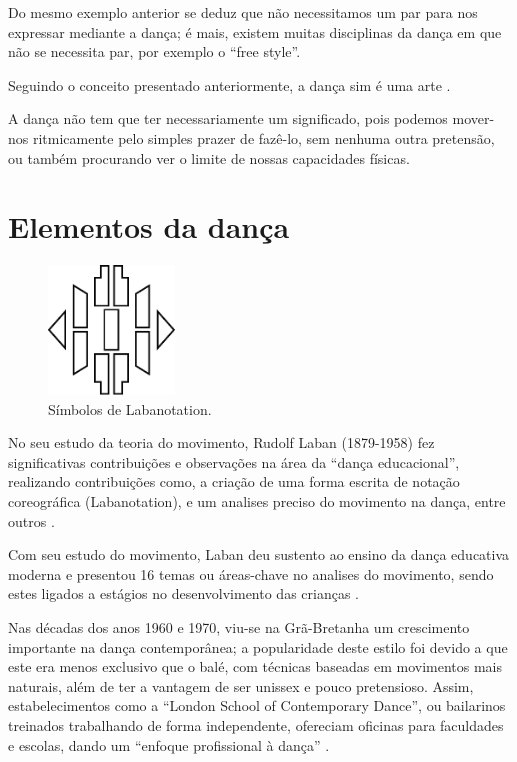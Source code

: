 Do mesmo exemplo anterior se deduz que não necessitamos um par para nos expressar mediante a dança;
é mais, existem muitas disciplinas da dança em que não se necessita par,
por exemplo o ``free style''.

Seguindo o conceito presentado anteriormente, a dança sim é uma arte \cite[pp. 17]{bencardinidanca}.

A dança não tem que ter necessariamente um significado, 
pois podemos mover-nos ritmicamente pelo simples prazer de fazê-lo, 
sem nenhuma outra pretensão, 
ou também procurando ver o limite de nossas capacidades físicas.

\section{Elementos da dança}
\begin{figure}
\centering
\includegraphics[width=0.30\textwidth]{chapters/cap-dance-elements/Labanotation2.eps}
\caption{Símbolos de Labanotation.}
\label{fig:elementosdanca1}
\end{figure}
 No seu estudo da teoria do movimento, Rudolf Laban (1879-1958) fez significativas contribuições e
observações na área da ``dança  educacional'',  
realizando contribuições como, a criação de uma forma escrita de notação coreográfica (Labanotation), 
e um  analises preciso do movimento na dança, entre outros \cite[pp. 18]{elementosdanca2017} \cite[pp. 11]{paine2014complete}.

Com seu estudo do movimento, 
Laban  deu sustento ao ensino da dança educativa moderna e 
presentou 16 temas ou áreas-chave no analises do movimento, 
sendo estes ligados a estágios no desenvolvimento das crianças  \cite[pp. 12]{paine2014complete}.

Nas décadas dos anos 1960 e 1970, 
viu-se  na Grã-Bretanha um crescimento importante na dança contemporânea;
a popularidade deste estilo foi devido a que este era menos exclusivo que o balé, 
com técnicas baseadas em movimentos mais naturais, 
além de ter a vantagem de ser unissex e pouco pretensioso.
Assim, estabelecimentos como a ``London School of Contemporary Dance'',
ou bailarinos treinados trabalhando de forma independente,
ofereciam oficinas para faculdades e escolas,
dando um ``enfoque profissional à dança'' \cite[pp. 12]{paine2014complete}.

